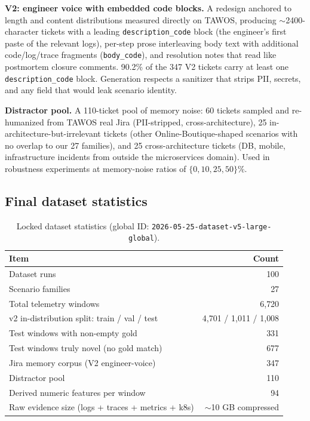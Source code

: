 \textbf{V2: engineer voice with embedded code blocks.} A redesign anchored to length and content distributions measured directly on TAWOS, producing $\sim$2400-character tickets with a leading \texttt{description\_code} block (the engineer's first paste of the relevant logs), per-step prose interleaving body text with additional code/log/trace fragments (\texttt{body\_code}), and resolution notes that read like postmortem closure comments. 90.2\% of the 347 V2 tickets carry at least one \texttt{description\_code} block. Generation respects a sanitizer that strips PII, secrets, and any field that would leak scenario identity.

\textbf{Distractor pool.} A 110-ticket pool of memory noise: 60 tickets sampled and re-humanized from TAWOS real Jira (PII-stripped, cross-architecture), 25 in-architecture-but-irrelevant tickets (other Online-Boutique-shaped scenarios with no overlap to our 27 families), and 25 cross-architecture tickets (DB, mobile, infrastructure incidents from outside the microservices domain). Used in robustness experiments at memory-noise ratios of $\{0, 10, 25, 50\}\%$.

\subsection{Final dataset statistics}

\begin{table}[h]
\centering
\caption{Locked dataset statistics (global ID: \texttt{2026-05-25-dataset-v5-large-global}).}
\label{tab:dataset-stats}
\small
\begin{tabular}{lr}
\toprule
Item & Count \\
\midrule
Dataset runs & 100 \\
Scenario families & 27 \\
Total telemetry windows & 6{,}720 \\
v2 in-distribution split: train / val / test & 4{,}701 / 1{,}011 / 1{,}008 \\
Test windows with non-empty gold & 331 \\
Test windows truly novel (no gold match) & 677 \\
Jira memory corpus (V2 engineer-voice) & 347 \\
Distractor pool & 110 \\
Derived numeric features per window & 94 \\
Raw evidence size (logs + traces + metrics + k8s) & $\sim$10 GB compressed \\
\bottomrule
\end{tabular}
\end{table}

